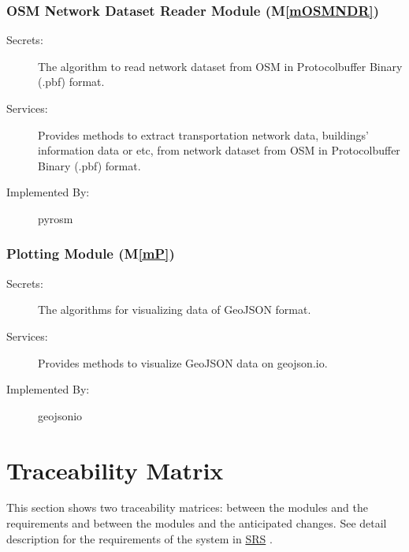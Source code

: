 \documentclass[12pt, titlepage]{article}
\newcommand{\mref}[1]{M\ref{#1}}
\begin{document}
\subsubsection{OSM Network Dataset Reader Module (\mref{mOSMNDR})}

\begin{description}
\item[Secrets:]The algorithm to read network dataset from OSM in Protocolbuffer Binary (.pbf) format.
\item[Services:] Provides methods to extract transportation network data, buildings' information data or etc, from network dataset from OSM in Protocolbuffer Binary (.pbf) format.
\item[Implemented By:] pyrosm
\end{description}

\subsubsection{Plotting Module (\mref{mP})}

\begin{description}
\item[Secrets:]The algorithms for visualizing data of GeoJSON format.
\item[Services:] Provides methods to visualize GeoJSON data on geojson.io.
\item[Implemented By:] geojsonio
\end{description}

\section{Traceability Matrix} \label{SecTM}

This section shows two traceability matrices: between the modules and the
requirements and between the modules and the anticipated changes. See detail description for the requirements of the system in \href{https://github.com/paezha/PyERT-BLACK/blob/main/docs/SRS/SRS.pdf}{SRS} \citep{SRS}.
\end{document}
